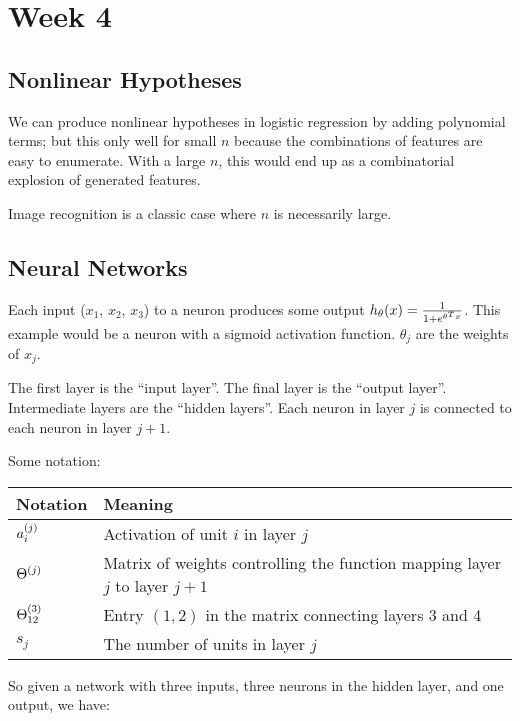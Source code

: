 \chapter{Week 4}

\section{Nonlinear Hypotheses}

We can produce nonlinear hypotheses in logistic regression by adding polynomial terms;
but this only well for small $n$ because the combinations of features are easy to enumerate.
With a large $n$, this would end up as a combinatorial explosion of generated features.

Image recognition is a classic case where $n$ is necessarily large.

\section{Neural Networks}

Each input ($x_1$, $x_2$, $x_3$) to a neuron 
produces some output $\hth(x) = \frac{1}{1 + e^{\theta^T x}}$.
This example would be a neuron with a sigmoid activation function.
$\theta_j$ are the weights of $x_j$.

The first layer is the ``input layer''.
The final layer is the ``output layer''.
Intermediate layers are the ``hidden layers''.
Each neuron in layer $j$ is connected to each neuron in layer $j+1$.

Some notation:

\begin{center}
  \begin{tabular}{l l}
    \hline
    Notation            & Meaning \\
    \hline
    $a\ss{i}{j}$      & Activation of unit $i$ in layer $j$ \\
    $\Theta\s{j}$      & Matrix of weights controlling the function mapping layer $j$ to layer $j+1$ \\
    $\Theta\ss{12}{3}$    & Entry $(1,2)$ in the matrix connecting layers 3 and 4 \\
    $s_j$               & The number of units in layer $j$ \\
    \hline
  \end{tabular}
\end{center}

So given a network with three inputs, three neurons in the hidden layer, and one output, we have:

